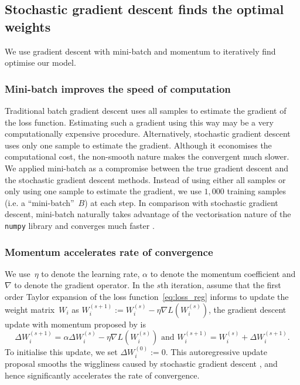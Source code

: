 \subsection{Stochastic gradient descent finds the optimal weights}
We use gradient descent with mini-batch and momentum to iteratively find optimise our model.
\subsubsection{Mini-batch improves the speed of computation \label{sec:minibatch}}
Traditional batch gradient descent uses all samples to estimate the gradient of the loss function. Estimating such a gradient using this way may be a very computationally expensive procedure. Alternatively, stochastic gradient descent uses only one sample to estimate the gradient. Although it economises the computational cost, the non-smooth nature makes the convergent much slower. 
We applied mini-batch as a compromise between the true gradient descent and the stochastic gradient descent methods. 
Instead of using either all samples or only using one sample to estimate the gradient, we use $1,000$ training samples (i.e. a ``mini-batch''~$B$) at each step. 
In comparison with stochastic gradient descent, mini-batch naturally takes advantage of the vectorisation nature of the \texttt{numpy} library and converges much faster \citep{DBLP:journals/corr/GoyalDGNWKTJH17}.

\subsubsection{Momentum accelerates rate of convergence}
We use~$\eta$ to denote the learning rate, $\alpha$ to denote the momentum coefficient and $\nabla$ to denote the gradient operator. In the $s$th iteration, assume that the first order Taylor expansion of the loss function~\eqref{eq:loss_reg} informs to update the weight matrix~$W_i$ as $W_i^{(s+1)}:=W_i^{(s)}-\eta\nabla L(W_i^{(s)})$, the gradient descent update with momentum proposed by \citet{rumelhart1986learning} is
\begin{equation*}
    \Delta W_i^{(s+1)}=\alpha \Delta W_i^{(s)}-\eta \nabla L(W_i^{(s)})\text{ and } W_i^{(s+1)}=W_i^{(s)}+\Delta W_i^{(s+1)}.
\end{equation*}
To initialise this update, we set $\Delta W_i^{(0)}:=0$. This autoregressive update proposal smooths the wiggliness caused by stochastic gradient descent \citep{rumelhart1986learning}, and hence significantly accelerates the rate of convergence.

